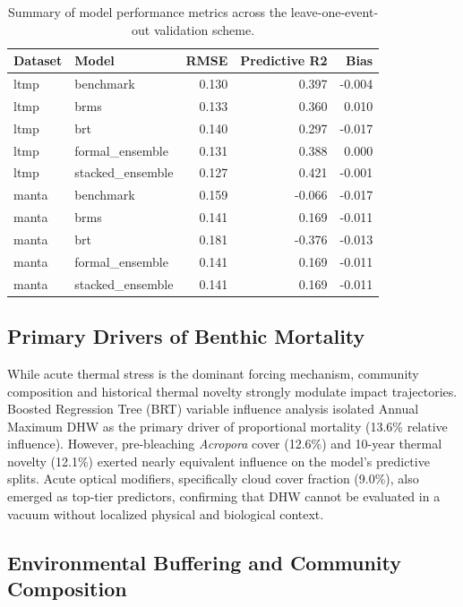 \documentclass[
  letterpaper,
  DIV=11,
  numbers=noendperiod]{scrartcl}
\begin{document}
\begin{longtable}[]{@{}llrrr@{}}

\caption{\label{tbl-summary}Summary of model performance metrics across
the leave-one-event-out validation scheme.}

\tabularnewline

\toprule\noalign{}
Dataset & Model & RMSE & Predictive R2 & Bias \\
\midrule\noalign{}
\endhead
\bottomrule\noalign{}
\endlastfoot
ltmp & benchmark & 0.130 & 0.397 & -0.004 \\
ltmp & brms & 0.133 & 0.360 & 0.010 \\
ltmp & brt & 0.140 & 0.297 & -0.017 \\
ltmp & formal\_ensemble & 0.131 & 0.388 & 0.000 \\
ltmp & stacked\_ensemble & 0.127 & 0.421 & -0.001 \\
manta & benchmark & 0.159 & -0.066 & -0.017 \\
manta & brms & 0.141 & 0.169 & -0.011 \\
manta & brt & 0.181 & -0.376 & -0.013 \\
manta & formal\_ensemble & 0.141 & 0.169 & -0.011 \\
manta & stacked\_ensemble & 0.141 & 0.169 & -0.011 \\

\end{longtable}

\subsection{Primary Drivers of Benthic
Mortality}\label{primary-drivers-of-benthic-mortality}

While acute thermal stress is the dominant forcing mechanism, community
composition and historical thermal novelty strongly modulate impact
trajectories. Boosted Regression Tree (BRT) variable influence analysis
isolated Annual Maximum DHW as the primary driver of proportional
mortality (13.6\% relative influence). However, pre-bleaching
\emph{Acropora} cover (12.6\%) and 10-year thermal novelty (12.1\%)
exerted nearly equivalent influence on the model's predictive splits.
Acute optical modifiers, specifically cloud cover fraction (9.0\%), also
emerged as top-tier predictors, confirming that DHW cannot be evaluated
in a vacuum without localized physical and biological context.

\subsection{Environmental Buffering and Community
Composition}\label{environmental-buffering-and-community-composition}
\end{document}
